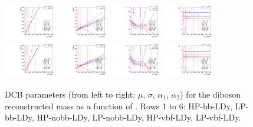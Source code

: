 \begin{figure}[htbp]
  \includegraphics[width=0.2\textwidth]{fig/2Dfit/paramSignalShape_allSig_MVV_HP_vbf_LDy_MEAN.pdf}
  \includegraphics[width=0.2\textwidth]{fig/2Dfit/paramSignalShape_allSig_MVV_HP_vbf_LDy_SIGMA.pdf}
  \includegraphics[width=0.2\textwidth]{fig/2Dfit/paramSignalShape_allSig_MVV_HP_vbf_LDy_ALPHA1.pdf}
  \includegraphics[width=0.2\textwidth]{fig/2Dfit/paramSignalShape_allSig_MVV_HP_vbf_LDy_ALPHA2.pdf}\\
  \includegraphics[width=0.2\textwidth]{fig/2Dfit/paramSignalShape_allSig_MVV_LP_vbf_LDy_MEAN.pdf}
  \includegraphics[width=0.2\textwidth]{fig/2Dfit/paramSignalShape_allSig_MVV_LP_vbf_LDy_SIGMA.pdf}
  \includegraphics[width=0.2\textwidth]{fig/2Dfit/paramSignalShape_allSig_MVV_LP_vbf_LDy_ALPHA1.pdf}
  \includegraphics[width=0.2\textwidth]{fig/2Dfit/paramSignalShape_allSig_MVV_LP_vbf_LDy_ALPHA2.pdf}\\
  \caption{
    DCB parameters (from left to right: $\mu$, $\sigma$, $\alpha_1$, $\alpha_2$) for the diboson reconstructed mass \MVV as a function of \MX.
    Rows 1 to 6: HP-bb-LDy, LP-bb-LDy, HP-nobb-LDy, LP-nobb-LDy, HP-vbf-LDy, LP-vbf-LDy.
  }
  \label{fig:MVVShapeParam_LDy_Run2}
\end{figure}

